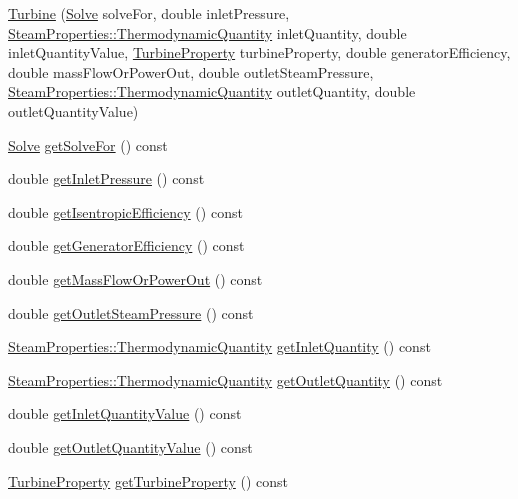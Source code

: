 \begin{DoxyCompactItemize}
\item 
\hyperlink{class_turbine_a1ec182906c075407882de542954d9030}{Turbine} (\hyperlink{class_turbine_a9fd7beba6c6f071e228fbe3e07969d2b}{Solve} solve\+For, double inlet\+Pressure, \hyperlink{class_steam_properties_ae0294bedf7d178c2d8fb6aed0f62fbff}{Steam\+Properties\+::\+Thermodynamic\+Quantity} inlet\+Quantity, double inlet\+Quantity\+Value, \hyperlink{class_turbine_a5db4f65cf2539e3837684d53221ade12}{Turbine\+Property} turbine\+Property, double generator\+Efficiency, double mass\+Flow\+Or\+Power\+Out, double outlet\+Steam\+Pressure, \hyperlink{class_steam_properties_ae0294bedf7d178c2d8fb6aed0f62fbff}{Steam\+Properties\+::\+Thermodynamic\+Quantity} outlet\+Quantity, double outlet\+Quantity\+Value)
\item 
\hyperlink{class_turbine_a9fd7beba6c6f071e228fbe3e07969d2b}{Solve} \hyperlink{class_turbine_a58c73057a4b890eab2af2b42c82484e6}{get\+Solve\+For} () const
\item 
double \hyperlink{class_turbine_a148ad3877851f1c3931d8a6771d750c5}{get\+Inlet\+Pressure} () const
\item 
double \hyperlink{class_turbine_a5d907859de4acc153a32bd443238b445}{get\+Isentropic\+Efficiency} () const
\item 
double \hyperlink{class_turbine_a92266fd994310d1842ba37c05bc40bf8}{get\+Generator\+Efficiency} () const
\item 
double \hyperlink{class_turbine_a820a090d264b96ee84f717555545c287}{get\+Mass\+Flow\+Or\+Power\+Out} () const
\item 
double \hyperlink{class_turbine_a1589b2364a553db7aaa875bb543d171d}{get\+Outlet\+Steam\+Pressure} () const
\item 
\hyperlink{class_steam_properties_ae0294bedf7d178c2d8fb6aed0f62fbff}{Steam\+Properties\+::\+Thermodynamic\+Quantity} \hyperlink{class_turbine_ac9e91d9539cea5cd1e0037c397c28c78}{get\+Inlet\+Quantity} () const
\item 
\hyperlink{class_steam_properties_ae0294bedf7d178c2d8fb6aed0f62fbff}{Steam\+Properties\+::\+Thermodynamic\+Quantity} \hyperlink{class_turbine_acd3e98ab67754b652de97498d9bec6d2}{get\+Outlet\+Quantity} () const
\item 
double \hyperlink{class_turbine_a3d8a3f317fa71abb3404144371615725}{get\+Inlet\+Quantity\+Value} () const
\item 
double \hyperlink{class_turbine_aca98f128213e02e95dfd6f4b2ad8de4e}{get\+Outlet\+Quantity\+Value} () const
\item 
\hyperlink{class_turbine_a5db4f65cf2539e3837684d53221ade12}{Turbine\+Property} \hyperlink{class_turbine_a14f6eff49b501aa8c5a22d404dbeaac0}{get\+Turbine\+Property} () const

\end{DoxyCompactItemize}
